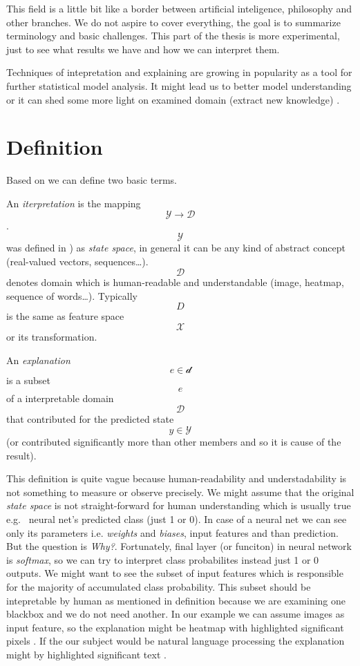 This field is a little bit like a border between artificial inteligence, philosophy and other branches. We do not aspire to cover everything, the goal is to summarize terminology and basic challenges. This part of the thesis is more experimental, just to see what results we have and how we can interpret them.


Techniques of intepretation and explaining are growing in popularity as a tool for further statistical model analysis. It might lead us to better model understanding or it can shed some more light on examined domain (extract new knowledge) \cite{Montavon2018}.

\section{Definition}

Based on \cite{Montavon2018} we can define two basic terms.
\begin{definition}
An \emph{iterpretation} is the mapping $$\mathcal{Y}\rightarrow\mathcal{D}$$. $$\mathcal{Y}$$ was defined in ) as \emph{state space}, in general it can be any kind of abstract concept (real-valued vectors, sequences\dots).  $$\mathcal{D}$$ denotes domain which is human-readable and understandable (image, heatmap, sequence of words\dots). Typically $$D$$ is the same as feature space  $$\mathcal{X}$$ or its transformation.
\end{definition}

\begin{definition}
    An \emph{explanation} $$e \in \mathcal{d}$$ is a subset $$e$$ of a interpretable domain $$\mathcal{D}$$ that contributed for the predicted state $$y \in \mathcal{Y}$$ (or contributed significantly more than other members and so it is cause of the result).
\end{definition}

This definition is quite vague because human-readability and understadability is not something to measure or observe precisely. We might assume that the original \emph{state space} is not straight-forward for human understanding which is usually true e.g. \ neural net's predicted class (just 1 or 0). In case of a neural net we can see only its parameters i.e. \emph{weights} and \emph{biases}, input features and than prediction. But the question is \emph{Why?}. Fortunately, final layer (or funciton) in neural network is \emph{softmax}, so we can try to interpret class probabilites instead just 1 or 0 outputs. We might want to see the subset of input features which is responsible for the majority of accumulated class probability. This subset should be intepretable by human as mentioned in definition because we are examining one blackbox and we do not need another. In our example we can assume images as input feature, so the explanation might be heatmap with highlighted significant pixels \cite{Lapuschkin2015, Simonyan2014, Landecker2013}. If the our subject would be natural language processing the explanation might by highlighted significant text \cite{Arras2017, Li2016}.

